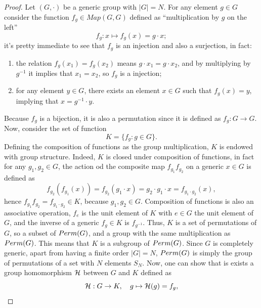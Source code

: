 \begin{proof}
    Let $(G,\cdot)$ be a generic group with $|G|= N$.  For any element $g \in G$ consider the function $f_g \in Map(G,G)$ defined as ``multiplication by $g$ on the left''
    \begin{equation}
        f_g : x \mapsto f_g(x) = g \cdot x;
    \end{equation}
    it's pretty immediate to see that $f_g$ is an injection and also a surjection, in fact:
    \begin{enumerate}
        \item the relation $f_g(x_1) = f_g(x_2)$ means $g\cdot x_1 = g \cdot x_2$, and by multiplying by $g^{-1}$ it implies that $x_1 = x_2$, so $f_g$ is a injection;
        \item for any element $y \in G$, there exists an element $x \in G$ such that $f_g(x) = y$, implying that $x = g^{-1} \cdot y$.
    \end{enumerate}
    Because $f_g$ is a bijection, it is also a permutation since it is defined as $f_g : G \to G$. Now, consider the set of function
    \begin{equation}
        K = \{f_g : g \in G\}.
    \end{equation}
    Defining the composition of functions as the group multiplication, $K$ is endowed with group structure. Indeed, $K$ is closed under composition of functions, in fact for any $g_1,g_2 \in G$, the action od the composite map $f_{g_1}f_{g_2}$ on a generic $x \in G$ is defined as
    \begin{equation}
        f_{g_2}(f_{g_1}(x)) = f_{g_2}(g_1 \cdot x) = g_2 \cdot g_1 \cdot x = f_{g_1\cdot g_2}(x),
    \end{equation}
    hence $f_{g_1}f_{g_2} = f_{g_1\cdot g_2} \in K$, because $g_1,g_2 \in G$. Composition of functions is also an associative operation, $f_e$ is the unit element of $K$ with $e \in G$ the unit element of $G$, and the inverse of a generic $f_g \in K$ is $f_{g^{-1}}$. Thus, $K$ is a set of permutations of $G$, so a subset of ${Perm}(G)$, and a group with the same multiplication as ${Perm}(G)$. This means that $K$  is a subgroup of ${Perm}(G)$. Since $G$ is completely generic, apart from having a finite order $|G| = N$, ${Perm}(G)$ is simply the group of permutations of a set with $N$ elements $S_N$. Now, one can show that is exists a group homomorphism $\mathcal{H}$ between $G$ and $K$ defined as
    \begin{equation}
        \mathcal{H} : G \to K,\quad g \mapsto \mathcal{H}(g) = f_g,
    \end{equation}

\end{proof}
